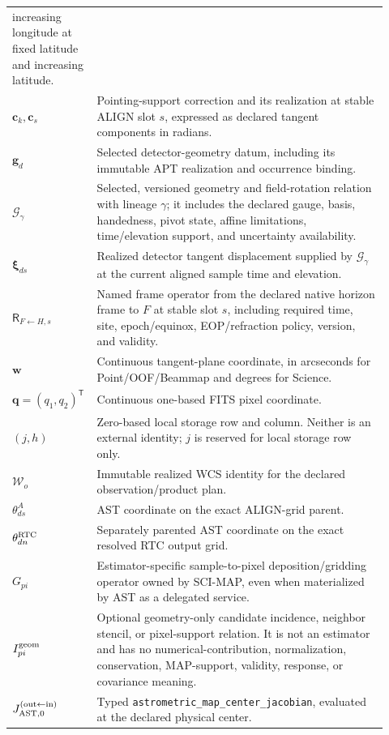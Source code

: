 \begin{longtable}{>{\raggedright\arraybackslash}p{0.16\linewidth}
                  >{\raggedright\arraybackslash}p{0.76\linewidth}}
increasing longitude at fixed latitude and increasing latitude. \\
$\boldsymbol c_k,\boldsymbol c_s$ & Pointing-support correction and its
realization at stable ALIGN slot $s$, expressed as declared tangent
components in radians. \\
$\boldsymbol g_d$ & Selected detector-geometry datum, including its immutable
APT realization and occurrence binding. \\
$\mathcal G_\gamma$ & Selected, versioned geometry and field-rotation relation
with lineage $\gamma$; it includes the declared gauge, basis, handedness,
pivot state, affine limitations, time/elevation support, and uncertainty
availability. \\
$\boldsymbol\xi_{ds}$ & Realized detector tangent displacement supplied by
$\mathcal G_\gamma$ at the current aligned sample time and elevation. \\
$\mathsf R_{F\leftarrow H,s}$ & Named frame operator from the declared native
horizon frame to $F$ at stable slot $s$, including required time, site,
epoch/equinox, EOP/refraction policy, version, and validity. \\
$\boldsymbol w$ & Continuous tangent-plane coordinate, in arcseconds for
Point/OOF/Beammap and degrees for Science. \\
$\boldsymbol q=(q_1,q_2)^\mathsf T$ & Continuous one-based FITS pixel
coordinate. \\
$(j,h)$ & Zero-based local storage row and column.  Neither is an external
identity; $j$ is reserved for local storage row only. \\
$\mathcal W_o$ & Immutable realized WCS identity for the declared
observation/product plan. \\
$\theta^A_{ds}$ & AST coordinate on the exact ALIGN-grid parent. \\
$\theta^{\rm RTC}_{dn}$ & Separately parented AST coordinate on the exact
resolved RTC output grid. \\
$G_{pi}$ & Estimator-specific sample-to-pixel deposition/gridding operator
owned by SCI-MAP, even when materialized by AST as a delegated service. \\
$I^{\rm geom}_{pi}$ & Optional geometry-only candidate incidence, neighbor
stencil, or pixel-support relation.  It is not an estimator and has no
numerical-contribution, normalization, conservation, MAP-support, validity,
response, or covariance meaning. \\
$J_{\rm AST,0}^{({\rm out}\leftarrow{\rm in})}$ & Typed
\texttt{astrometric\_map\_center\_jacobian}, evaluated at the declared
physical center. \\
\bottomrule
\end{longtable}

